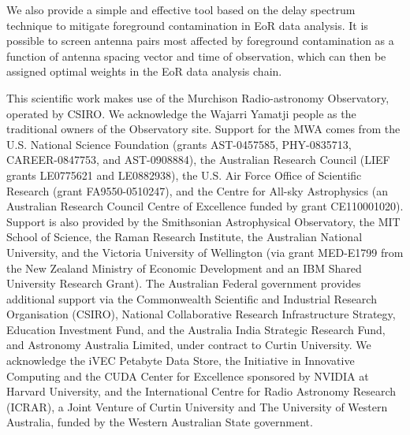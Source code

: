 \documentclass[preprint2,iop,numberedappendix]{emulateapj}
\begin{document}
We also provide a simple and effective tool based on the delay spectrum technique to mitigate foreground contamination in EoR data analysis. It is possible to screen antenna pairs most affected by foreground contamination as a function of antenna spacing vector and time of observation, which can then be assigned optimal weights in the EoR data analysis chain.

\acknowledgments

This scientific work makes use of the Murchison Radio-astronomy Observatory, operated by CSIRO. We acknowledge the Wajarri Yamatji people as the traditional owners of the Observatory site. Support for the MWA comes from the U.S. National Science Foundation (grants AST-0457585, PHY-0835713, CAREER-0847753, and AST-0908884), the Australian Research Council (LIEF grants LE0775621 and LE0882938), the U.S. Air Force Office of Scientific Research (grant FA9550-0510247), and the Centre for All-sky Astrophysics (an Australian Research Council Centre of Excellence funded by grant CE110001020). Support is also provided by the Smithsonian Astrophysical Observatory, the MIT School of Science, the Raman Research Institute, the Australian National University, and the Victoria University of Wellington (via grant MED-E1799 from the New Zealand Ministry of Economic Development and an IBM Shared University Research Grant). The Australian Federal government provides additional support via the Commonwealth Scientific and Industrial Research Organisation (CSIRO), National Collaborative Research Infrastructure Strategy, Education Investment Fund, and the Australia India Strategic Research Fund, and Astronomy Australia Limited, under contract to Curtin University. We acknowledge the iVEC Petabyte Data Store, the Initiative in Innovative Computing and the CUDA Center for Excellence sponsored by NVIDIA at Harvard University, and the International Centre for Radio Astronomy Research (ICRAR), a Joint Venture of Curtin University and The University of Western Australia, funded by the Western Australian State government.  

\appendix

\par\bigskip


\end{document}
